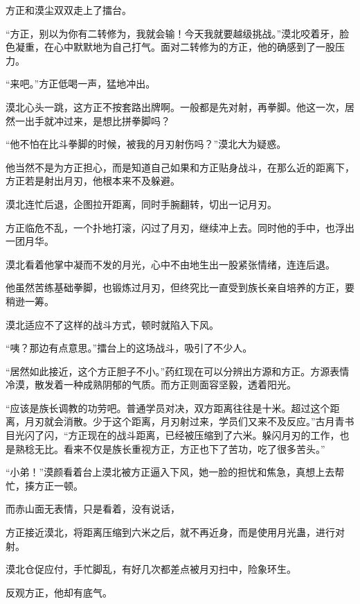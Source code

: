 
\begin{this_body}



方正和漠尘双双走上了擂台。

“方正，别以为你有二转修为，我就会输！今天我就要越级挑战。”漠北咬着牙，脸色凝重，在心中默默地为自己打气。面对二转修为的方正，他的确感到了一股压力。

“来吧。”方正低喝一声，猛地冲出。

漠北心头一跳，这方正不按套路出牌啊。一般都是先对射，再拳脚。他这一次，居然一出手就冲过来，是想比拼拳脚吗？

“他不怕在比斗拳脚的时候，被我的月刃射伤吗？”漠北大为疑惑。

他当然不是为方正担心，而是知道自己如果和方正贴身战斗，在那么近的距离下，方正若是射出月刃，他根本来不及躲避。

漠北连忙后退，企图拉开距离，同时手腕翻转，切出一记月刃。

方正临危不乱，一个扑地打滚，闪过了月刃，继续冲上去。同时他的手中，也浮出一团月华。

漠北看着他掌中凝而不发的月光，心中不由地生出一股紧张情绪，连连后退。

他虽然苦练基础拳脚，也锻炼过月刃，但终究比一直受到族长亲自培养的方正，要稍逊一筹。

漠北适应不了这样的战斗方式，顿时就陷入下风。

“咦？那边有点意思。”擂台上的这场战斗，吸引了不少人。

“居然如此接近，这个方正胆子不小。”药红现在可以分辨出方源和方正。方源表情冷漠，散发着一种成熟阴郁的气质。而方正则面容坚毅，透着阳光。

“应该是族长调教的功劳吧。普通学员对决，双方距离往往是十米。超过这个距离，月刃就会消散。少于这个距离，月刃射过来，学员们又来不及反应。”古月青书目光闪了闪，“方正现在的战斗距离，已经被压缩到了六米。躲闪月刃的工作，也是熟稔无比。看来不仅是族长重视方正，方正也下了苦功，吃了很多苦头。”

“小弟！”漠颜看着台上漠北被方正逼入下风，她一脸的担忧和焦急，真想上去帮忙，揍方正一顿。

而赤山面无表情，只是看着，没有说话，

方正接近漠北，将距离压缩到六米之后，就不再近身，而是使用月光蛊，进行对射。

漠北仓促应付，手忙脚乱，有好几次都差点被月刃扫中，险象环生。

反观方正，他却有底气。


\end{this_body}
